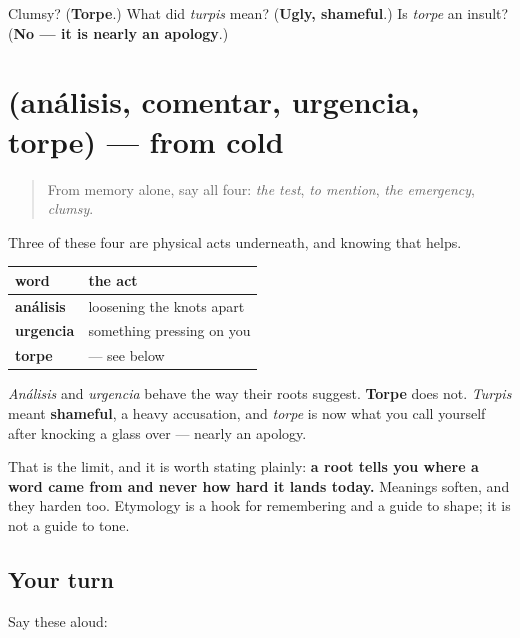 \begin{tcolorbox}[breakable,colback=teal!4,colframe=teal!35!black,title={Before you move on}]
Clumsy? (\textbf{Torpe}.) What did \emph{turpis} mean? (\textbf{Ugly, shameful}.) Is \emph{torpe} an insult? (\textbf{No — it is nearly an apology}.)
\end{tcolorbox}
\section[(análisis, comentar, urgencia, torpe)]{(análisis, comentar, urgencia, torpe) — from cold}

\label{lesson:ES-R447-repaso-juicio}



\begin{quote}
From memory alone, say all four: \emph{the test}, \emph{to mention}, \emph{the emergency}, \emph{clumsy}.
\end{quote}

\begin{grammarlens}[title={Grammar Lens: what a root tells you, and what it does not}]
Three of these four are physical acts underneath, and knowing that helps.

\noindent
\begin{tabularx}{\linewidth}{@{}>{\raggedright\arraybackslash}X>{\raggedright\arraybackslash}X@{}}
\toprule
\textbf{word} & \textbf{the act} \\
\midrule
\textbf{análisis} & loosening the knots apart \\
\textbf{urgencia} & something pressing on you \\
\textbf{torpe} & — see below \\
\bottomrule
\end{tabularx}

\emph{Análisis} and \emph{urgencia} behave the way their roots suggest. \textbf{Torpe} does not. \emph{Turpis} meant \textbf{shameful}, a heavy accusation, and \emph{torpe} is now what you call yourself after knocking a glass over — nearly an apology.

That is the limit, and it is worth stating plainly: \textbf{a root tells you where a word came from and never how hard it lands today.} Meanings soften, and they harden too. Etymology is a hook for remembering and a guide to shape; it is not a guide to tone.
\end{grammarlens}

\subsection*{Your turn}
Say these aloud:

